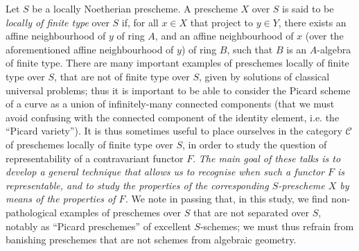 \documentclass{article}
\renewcommand{\cal}[1]{{\mathcal{#1}}}
\newcommand{\oldpage}[1]{\marginpar{\footnotesize$\Big\vert$ \textit{p.~#1}}}
\begin{document}
Let $S$ be a locally Noetherian prescheme.
A prescheme $X$ over $S$ is said to be
\oldpage{195-11}
\emph{locally of finite type} over $S$ if, for all $x\in X$ that project to $y\in Y$, there exists an affine neighbourhood of $y$ of ring $A$, and an affine neighbourhood of $x$ (over the aforementioned affine neighbourhood of $y$) of ring $B$, such that $B$ is an $A$-algebra of finite type.
There are many important examples of preschemes locally of finite type over $S$, that are not of finite type over $S$, given by solutions of classical universal problems;
thus it is important to be able to consider the Picard scheme of a curve as a union of infinitely-many connected components (that we must avoid confusing with the connected component of the identity element, i.e. the ``Picard variety'').
It is thus sometimes useful to place ourselves in the category $\cal{C}$ of preschemes locally of finite type over $S$, in order to study the question of representability of a contravariant functor $F$.
\emph{The main goal of these talks is to develop a general technique that allows us to recognise when such a functor $F$ is representable, and to study the properties of the corresponding $S$-prescheme $X$ by means of the properties of $F$.}
We note in passing that, in this study, we find non-pathological examples of preschemes over $S$ that are not separated over $S$, notably as ``Picard preschemes'' of excellent $S$-schemes;
we must thus refrain from banishing preschemes that are not schemes from algebraic geometry.
\end{document}
